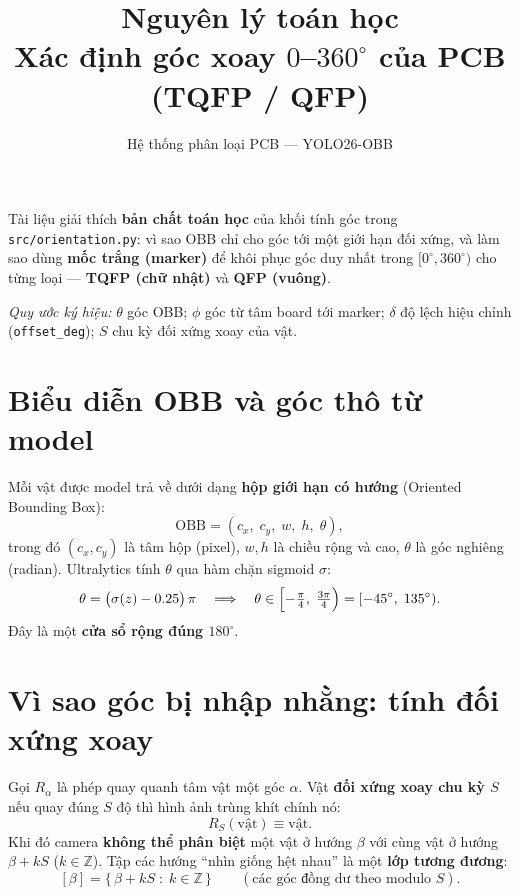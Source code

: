 \documentclass[12pt,a4paper]{article}
\title{Nguyên lý toán học\\[2pt]\large Xác định góc xoay $0$--$360^\circ$ của PCB (TQFP / QFP)}
\author{Hệ thống phân loại PCB --- YOLO26-OBB}
\date{}
\newcommand{\code}[1]{\texttt{#1}}
\begin{document}
\maketitle

Tài liệu giải thích \textbf{bản chất toán học} của khối tính góc trong
\code{src/orientation.py}: vì sao OBB chỉ cho góc tới một giới hạn đối xứng, và làm sao
dùng \textbf{mốc trắng (marker)} để khôi phục góc duy nhất trong $[0^\circ, 360^\circ)$
cho từng loại --- \textbf{TQFP (chữ nhật)} và \textbf{QFP (vuông)}.

\bigskip
\noindent\textit{Quy ước ký hiệu:} $\theta$ góc OBB; $\phi$ góc từ tâm board tới marker;
$\delta$ độ lệch hiệu chỉnh (\code{offset\_deg}); $S$ chu kỳ đối xứng xoay của vật.

\tableofcontents
\bigskip

\section{Biểu diễn OBB và góc thô từ model}

Mỗi vật được model trả về dưới dạng \textbf{hộp giới hạn có hướng} (Oriented Bounding Box):
\[
\text{OBB} = (c_x,\; c_y,\; w,\; h,\; \theta),
\]
trong đó $(c_x,c_y)$ là tâm hộp (pixel), $w,h$ là chiều rộng và cao, $\theta$ là góc nghiêng
(radian). Ultralytics tính $\theta$ qua hàm chặn sigmoid $\sigma$:
\[
\theta = \bigl(\sigma(z) - 0.25\bigr)\,\pi
\quad\Longrightarrow\quad
\theta \in \Bigl[-\tfrac{\pi}{4},\; \tfrac{3\pi}{4}\Bigr) = [-45^\circ,\; 135^\circ).
\]
Đây là một \textbf{cửa sổ rộng đúng $180^\circ$}.

\section{Vì sao góc bị nhập nhằng: tính đối xứng xoay}

Gọi $R_\alpha$ là phép quay quanh tâm vật một góc $\alpha$. Vật \textbf{đối xứng xoay chu kỳ
$S$} nếu quay đúng $S$ độ thì hình ảnh trùng khít chính nó:
\[
R_S(\text{vật}) \equiv \text{vật}.
\]
Khi đó camera \textbf{không thể phân biệt} một vật ở hướng $\beta$ với cùng vật ở hướng
$\beta + kS$ ($k \in \mathbb{Z}$). Tập các hướng ``nhìn giống hệt nhau'' là một
\textbf{lớp tương đương}:
\[
[\beta] = \{\, \beta + kS \;:\; k \in \mathbb{Z} \,\}
\qquad (\text{các góc đồng dư theo modulo } S).
\]
\end{document}
